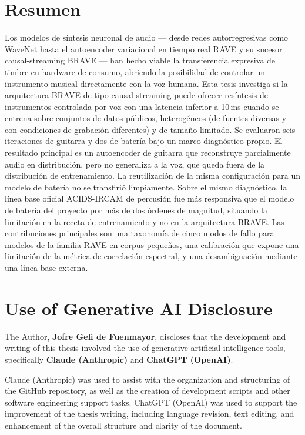 \documentclass[a4paper,11pt,oneside,openany]{book}
\begin{document}
\chapter*{Resumen}
%
Los modelos de síntesis neuronal de audio --- desde redes autorregresivas como WaveNet hasta el autoencoder variacional en tiempo real RAVE y su sucesor causal-streaming BRAVE --- han hecho viable la transferencia expresiva de timbre en hardware de consumo, abriendo la posibilidad de controlar un instrumento musical directamente con la voz humana. Esta tesis investiga si la arquitectura BRAVE de tipo causal-streaming puede ofrecer resíntesis de instrumentos controlada por voz con una latencia inferior a 10\,ms cuando se entrena sobre conjuntos de datos públicos, heterogéneos (de fuentes diversas y con condiciones de grabación diferentes) y de tamaño limitado. Se evaluaron seis iteraciones de guitarra y dos de batería bajo un marco diagnóstico propio. El resultado principal es un autoencoder de guitarra que reconstruye parcialmente audio en distribución, pero no generaliza a la voz, que queda fuera de la distribución de entrenamiento. La reutilización de la misma configuración para un modelo de batería no se transfirió limpiamente. Sobre el mismo diagnóstico, la línea base oficial ACIDS-IRCAM de percusión fue más responsiva que el modelo de batería del proyecto por más de dos órdenes de magnitud, situando la limitación en la receta de entrenamiento y no en la arquitectura BRAVE. Las contribuciones principales son una taxonomía de cinco modos de fallo para modelos de la familia RAVE en corpus pequeños, una calibración que expone una limitación de la métrica de correlación espectral, y una desambiguación mediante una línea base externa.
%

\chapter*{Use of Generative AI Disclosure}
The Author, \textbf{Jofre Geli de Fuenmayor}, discloses that the development and writing of this thesis involved the use of generative artificial intelligence tools, specifically \textbf{Claude (Anthropic)} and \textbf{ChatGPT (OpenAI)}.

Claude (Anthropic) was used to assist with the organization and structuring of the GitHub repository, as well as the creation of development scripts and other software engineering support tasks. ChatGPT (OpenAI) was used to support the improvement of the thesis writing, including language revision, text editing, and enhancement of the overall structure and clarity of the document.
\end{document}
